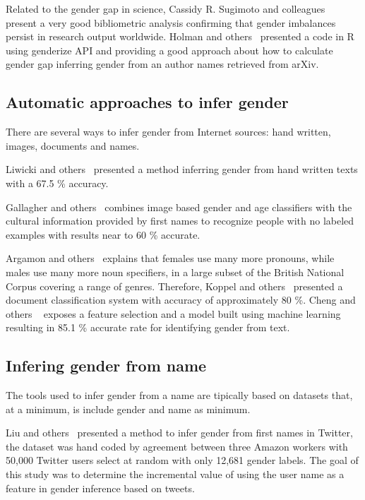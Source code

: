 \documentclass[a4paper]{article}
\begin{document}
Related to the gender gap in science, Cassidy R. Sugimoto and
colleagues~\cite{lariviere2013bibliometrics}
present a very good bibliometric analysis confirming that gender
imbalances persist in research output worldwide. Holman and others~\cite{holman2018gender}
presented a code in R using genderize API and providing a good approach
about how to calculate gender gap inferring gender from an author
names retrieved from arXiv. 

\subsection{Automatic approaches to infer gender}

There are several ways to infer gender from Internet
sources: hand written, images, documents and names.

Liwicki and others~\cite{liwicki2011automatic} presented a method
inferring gender from hand written texts with a 67.5 \% accuracy.

Gallagher and others~\cite{gallagher2008estimating} combines
image based gender and age classifiers with the cultural 
information provided by first names to recognize people
with no labeled examples with results near to 60 \% accurate.

Argamon and others~\cite{argamon2003gender} explains that
females use many more pronouns, while males use many more
noun specifiers, in a large subset of the British National
Corpus covering a range of genres. Therefore,
Koppel and others~\cite{koppel2002automatically} presented
a document classification system with accuracy of
approximately 80 \%. Cheng and others ~\cite{cheng2011author}
exposes a feature selection and a model built using machine learning
resulting in 85.1 \% accurate rate for identifying gender from text.

\subsection{Infering gender from name}

The tools used to infer gender from a name are tipically based on
datasets that, at a minimum, is include gender and name as minimum.

Liu and others~\cite{liu2013s} presented a method to infer gender
from first names in Twitter, the dataset was hand coded by agreement
between three Amazon workers with 50,000 Twitter users select at
random with only 12,681 gender labels. The goal of this study was
to determine the incremental value of using the user name as a feature
in gender inference based on tweets.
\end{document}
